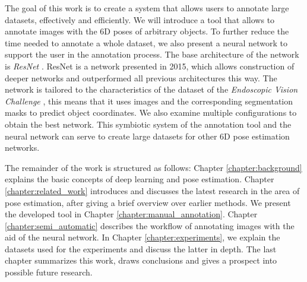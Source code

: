 The goal of this work is to create a system that allows users to annotate large datasets, effectively and efficiently. We will introduce a tool that allows to annotate images with the 6D poses of arbitrary objects. To further reduce the time needed to annotate a whole dataset, we also present a neural network to support the user in the annotation process. The base architecture of the network is \textit{ResNet} \cite{resnet}. ResNet is a network presented in 2015, which allows construction of deeper networks and outperformed all previous architectures this way. The network is tailored to the characteristics of the dataset of the \textit{Endoscopic Vision Challenge} \cite{endovis}, this means that it uses images and the corresponding segmentation masks to predict object coordinates. We also examine multiple configurations to obtain the best network. This symbiotic system of the annotation tool and the neural network can serve to create large datasets for other 6D pose estimation networks.

The remainder of the work is structured as follows: Chapter \ref{chapter:background} explains the basic concepts of deep learning and pose estimation. Chapter \ref{chapter:related_work} introduces and discusses the latest research in the area of pose estimation, after giving a brief overview over earlier methods. We present the developed tool in Chapter \ref{chapter:manual_annotation}. Chapter \ref{chapter:semi_automatic} describes the workflow of annotating images with the aid of the neural network. In Chapter \ref{chapter:experiments}, we explain the datasets used for the experiments and discuss the latter in depth. The last chapter summarizes this work, draws conclusions and gives a prospect into possible future research.